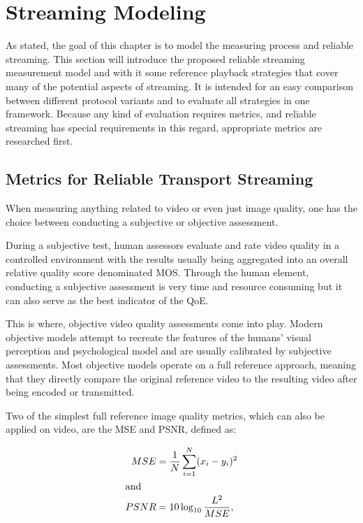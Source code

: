 \section{Streaming Modeling}
\label{c3:sec:modeling}

As stated, the goal of this chapter is to model the measuring process and reliable streaming. This section will introduce the proposed reliable streaming measurement model and with it some reference playback strategies that cover many of the potential aspects of streaming. It is intended for an easy comparison between different protocol variants and to evaluate all strategies in one framework. Because any kind of evaluation requires metrics, and reliable streaming has special requirements in this regard, appropriate metrics are researched first.


\subsection{Metrics for Reliable Transport Streaming}
\label{c3:sec:metrics}

When measuring anything related to video or even just image quality, one has the choice between conducting a subjective or objective assessment. 

During a subjective test, human assessors evaluate and rate video quality in a controlled environment with the results usually being aggregated into an overall relative quality score denominated \gls{MOS}. Through the human element, conducting a subjective assessment is very time and resource consuming but it can also serve as the best indicator of the \gls{QoE}.

This is where, objective video quality assessments come into play. Modern objective models attempt to recreate the features of the humans' visual perception and psychological model and are usually calibrated by subjective assessments. Most objective models operate on a full reference approach, meaning that they directly compare the original reference video to the resulting video after being encoded or transmitted.

Two of the simplest full reference image quality metrics, which can also be applied on video, are the \gls{MSE} and \gls{PSNR}, defined as:


\begin{align}
MSE &= \frac{1}{N} \sum_{i=1}^{N}(x_i - y_i)^2\\
\shortintertext{and}
PSNR &= 10 \log_{10} \frac{L^2}{MSE},
\end{align}


